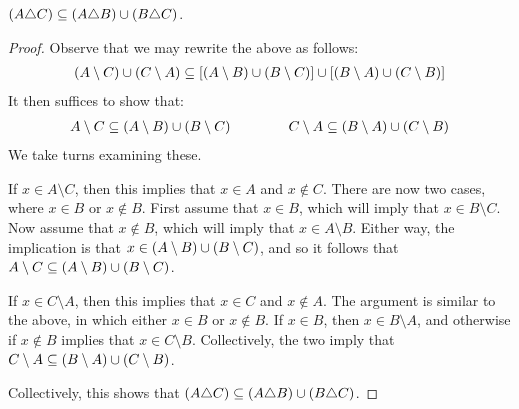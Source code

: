 \begin{lemma}
  \(\left(A \triangle C\right)
          \subseteq \left(A \triangle B\right) \cup \left(B \triangle C\right)\).
\end{lemma}
\begin{proof}
  Observe that we may rewrite the above as follows:
  \begin{align*}
    \left(A \setminus C\right) \cup \left(C \setminus A\right)
      \subseteq
        \left[\left(A \setminus B\right) \cup \left(B \setminus C\right)\right] \cup
        \left[\left(B \setminus A\right) \cup \left(C \setminus B\right)\right]
  \end{align*}
  It then suffices to show that:
  \begin{align*}
    A \setminus C
      \subseteq \left(A \setminus B\right) \cup \left(B \setminus C\right)
    \qquad
    \qquad
    C \setminus A
      \subseteq \left(B \setminus A\right) \cup \left(C \setminus B\right)
  \end{align*}
  We take turns examining these.

      If \(x \in A \setminus C\), then this implies that \(x \in A\)
      and \(x \not\in C\).
      There are now two cases, where \(x \in B\) or \(x \not\in B\).
      First assume that \(x \in B\), which will imply that
      \(x \in B \setminus C\).
      Now assume that \(x \not\in B\), which will imply that
      \(x \in A \setminus B\).
      Either way, the implication is that
      \(x \in \left(A \setminus B\right) \cup \left(B \setminus C\right)\),
      and so it follows that
      \(A \setminus C
      \subseteq \left(A \setminus B\right) \cup \left(B \setminus C\right)\).

      If \(x \in C \setminus A\), then this implies that
      \(x \in C\) and \(x \not\in A\).
      The argument is similar to the above, in which either
      \(x \in B\) or \(x \not\in B\).
      If \(x \in B\), then \(x \in B \setminus A\),
      and otherwise if \(x \not\in B\) implies that
      \(x \in C \setminus B\).
      Collectively, the two imply that
      \(C \setminus A \subseteq
        \left(B \setminus A\right) \cup \left(C \setminus B\right)\).

  Collectively, this shows that
  \(\left(A \triangle C\right)
          \subseteq \left(A \triangle B\right) \cup \left(B \triangle C\right)\).
\end{proof}


